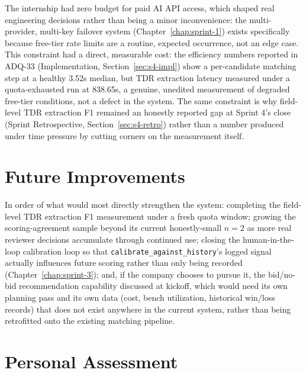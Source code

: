 \documentclass[12pt,a4paper]{report}
\begin{document}
The internship had zero budget for paid AI API access, which shaped real
engineering decisions rather than being a minor inconvenience: the
multi-provider, multi-key failover system (Chapter~\ref{chap:sprint-1})
exists specifically because free-tier rate limits are a routine, expected
occurrence, not an edge case. This constraint had a direct, measurable
cost: the efficiency numbers reported in ADQ-33 (Implementation,
Section~\ref{sec:s4-impl}) show a
per-candidate matching step at a healthy 3.52s median, but TDR extraction
latency measured under a quota-exhausted run at 838.65s, a genuine,
unedited measurement of degraded free-tier conditions, not a defect in
the system. The same constraint is why field-level TDR extraction F1
remained an honestly reported gap at Sprint 4's close
(Sprint Retrospective, Section~\ref{sec:s4-retro}) rather than a
number produced under time pressure by cutting corners on the
measurement itself.

\section*{Future Improvements}

In order of what would most directly strengthen the system: completing
the field-level TDR extraction F1 measurement under a fresh quota window;
growing the scoring-agreement sample beyond its current honestly-small
$n{=}2$ as more real reviewer decisions accumulate through continued use;
closing the human-in-the-loop calibration loop so that
\texttt{calibrate\_against\_history}'s logged signal actually influences
future scoring rather than only being recorded
(Chapter~\ref{chap:sprint-3}); and, if the company chooses to pursue it,
the bid/no-bid recommendation capability discussed at kickoff, which
would need its own planning pass and its own data (cost, bench
utilization, historical win/loss records) that does not exist anywhere
in the current system, rather than being retrofitted onto the existing
matching pipeline.

\section*{Personal Assessment}

\end{document}
